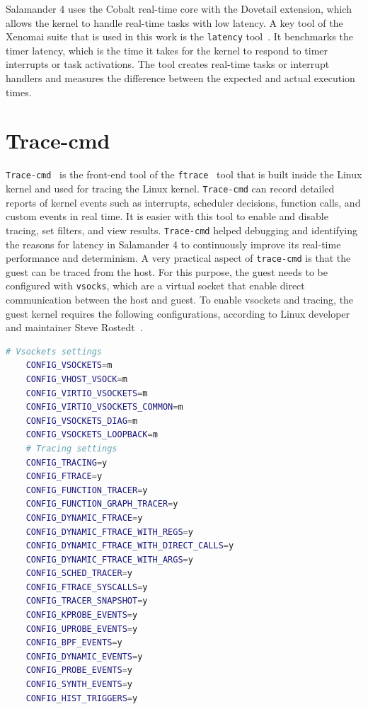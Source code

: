 \documentclass[MMR,Master,english]{style/twbook}
\begin{document}
\noindent Salamander 4 uses the Cobalt real-time core with the Dovetail extension, which allows the kernel to handle real-time tasks with low latency. A key tool of the Xenomai suite that is used in this work is the \texttt{latency} tool~\cite{LATENCY}. It benchmarks the timer latency, which is the time it takes for the kernel to respond to timer interrupts or task activations. The tool creates real-time tasks or interrupt handlers and measures the difference between the expected and actual execution times.

\section{Trace-cmd}\label{sec:trace-cmd}
\texttt{Trace-cmd}~\cite{Tracecmd} is the front-end tool of the \texttt{ftrace}~\cite{FtraceFunctionTracer} tool that is built inside the Linux kernel and used for tracing the Linux kernel. \texttt{Trace-cmd} can record detailed reports of kernel events such as interrupts, scheduler decisions, function calls, and custom events in real time. It is easier with this tool to enable and disable tracing, set filters, and view results. \texttt{Trace-cmd} helped debugging and identifying the reasons for latency in Salamander 4 to continuously improve its real-time performance and determinism. A very practical aspect of \texttt{trace-cmd} is that the guest can be traced from the host. For this purpose, the guest needs to be configured with \texttt{vsocks}, which are a virtual socket that enable direct communication between the host and guest. To enable vsockets and tracing, the guest kernel requires the following configurations, according to Linux developer and maintainer Steve Rostedt~\cite{rostedtTracecmdHostGuest}.

\vspace{2em}
\begin{lstlisting}[language=bash, caption={Kernel Flags for Vsocks and Tracing}, label={lst:kernel-config}]
	# Vsockets settings
	CONFIG_VSOCKETS=m
	CONFIG_VHOST_VSOCK=m
	CONFIG_VIRTIO_VSOCKETS=m
	CONFIG_VIRTIO_VSOCKETS_COMMON=m
	CONFIG_VSOCKETS_DIAG=m
	CONFIG_VSOCKETS_LOOPBACK=m
	# Tracing settings
	CONFIG_TRACING=y
	CONFIG_FTRACE=y
	CONFIG_FUNCTION_TRACER=y
	CONFIG_FUNCTION_GRAPH_TRACER=y
	CONFIG_DYNAMIC_FTRACE=y
	CONFIG_DYNAMIC_FTRACE_WITH_REGS=y
	CONFIG_DYNAMIC_FTRACE_WITH_DIRECT_CALLS=y
	CONFIG_DYNAMIC_FTRACE_WITH_ARGS=y
	CONFIG_SCHED_TRACER=y
	CONFIG_FTRACE_SYSCALLS=y
	CONFIG_TRACER_SNAPSHOT=y
	CONFIG_KPROBE_EVENTS=y
	CONFIG_UPROBE_EVENTS=y
	CONFIG_BPF_EVENTS=y
	CONFIG_DYNAMIC_EVENTS=y
	CONFIG_PROBE_EVENTS=y
	CONFIG_SYNTH_EVENTS=y
	CONFIG_HIST_TRIGGERS=y
	\end{lstlisting}
\end{document}
